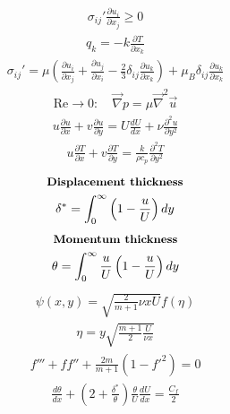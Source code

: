 \documentclass[10pt, a4paper]{article}
\begin{document}
\begin{multicols}{2}
\begin{gather*}
    \sigma_{ij}' \frac{\partial u_i}{\partial x_j} \geq 0
\end{gather*}
\begin{gather*}
    q_k = -k\frac{\partial T}{\partial x_k}
\end{gather*}
\begin{gather*}
    \sigma_{ij}' = \mu \left( \frac{\partial u_i}{\partial x_j} + \frac{\partial u_j}{\partial x_i}
    - \frac23\delta_{ij}\frac{\partial u_k}{\partial x_k} \right) + \mu_B\delta_{ij}\frac{\partial u_k}{\partial x_k}
\end{gather*}
\begin{gather*}
    \text{Re} \rightarrow 0: \quad \vec{\nabla}p = \mu \vec{\nabla}^2 \vec{u}
\end{gather*}
\begin{gather*}
    u\frac{\partial u}{\partial x} + v \frac{\partial u}{\partial y} =
    U \frac{dU}{dx} + \nu \frac{\partial^2 u}{\partial y^2}
\end{gather*}
\begin{gather*}
    u\frac{\partial T}{\partial x} + v \frac{\partial T}{\partial y} =
    \frac{k}{\rho c_p} \frac{\partial^2 T}{\partial y^2}
\end{gather*}
\begin{gather*}
    \textbf{\small Displacement thickness} \\
    \delta^* = \int_0^\infty\left( 1 - \frac{u}{U} \right)dy
\end{gather*}
\begin{gather*}
    \textbf{\small Momentum thickness} \\
    \theta = \int_0^\infty \frac{u}{U}\left( 1 - \frac{u}{U} \right)dy
\end{gather*}
\begin{gather*}
    \psi(x,y) = \sqrt{\frac{2}{m+1}\nu x U}f(\eta)
\end{gather*}
\begin{gather*}
    \eta = y \sqrt{\frac{m+1}{2}\frac{U}{\nu x}}
\end{gather*}
\begin{gather*}
    f''' + ff'' + \frac{2m}{m+1}(1-f'^2)=0
\end{gather*}
\begin{gather*}
    \frac{d\theta}{dx} + \left( 2 + \frac{\delta^*}{\theta} \right)\frac{\theta}{U}\frac{dU}{dx} =
    \frac{C_f}{2}
\end{gather*}
\end{multicols}
\end{document}
